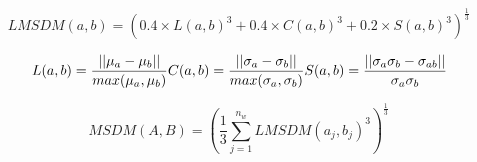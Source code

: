 
\begin{equation}
LMSDM(a,b) = (0.4\times L(a,b)^3+0.4\times C(a,b)^3+0.2\times S(a,b)^3)^{\frac{1}{3}}
\end{equation}

\begin{equation}
 L(a,b) = \frac{||\mu_a-\mu_b||}{max(\mu_a, \mu_b)}\\
 C(a,b) = \frac{||\sigma_a-\sigma_b||}{max(\sigma_a, \sigma_b)}\\
 S(a,b) = \frac{||\sigma_a\sigma_b -\sigma_{ab}||}{\sigma_a\sigma_b}
\end{equation}

\begin{equation}
MSDM(A,B) = (\frac{1}{3} \sum_{j=1}^{n_w}{LMSDM(a_j,b_j)^3})^{\frac{1}{3}}
\end{equation}
